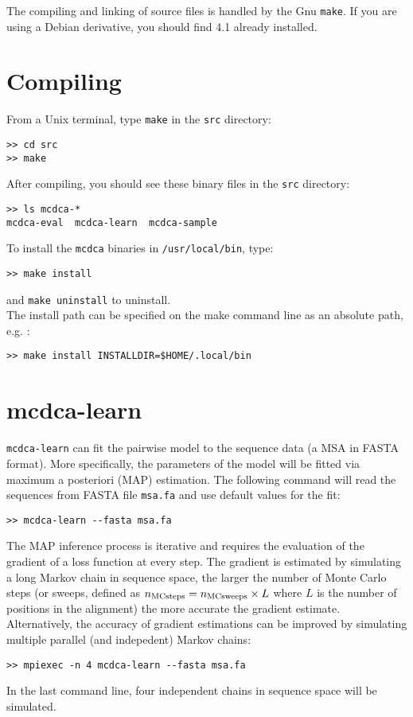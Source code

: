 \documentclass[a4paper,onecolumn]{article}
\begin{document}
The compiling and linking of source files is handled by the Gnu \verb|make|. 
If you are using a Debian derivative, you should find 4.1 already installed.

\newpage
\section{Compiling}
\label{sec:compiling}
From a Unix terminal, type \verb|make| in the \verb|src| directory:
\begin{verbatim}
>> cd src
>> make
\end{verbatim}
After compiling, you should see these binary files in the \verb|src| directory:
\begin{verbatim}
>> ls mcdca-*
mcdca-eval  mcdca-learn  mcdca-sample
\end{verbatim}
To install the \verb|mcdca| binaries in \verb|/usr/local/bin|, type:
\begin{verbatim}
>> make install
\end{verbatim}
and \verb|make uninstall| to uninstall.\\
The install path can be specified on the make command line as an absolute path,
e.g. :
\begin{verbatim}
>> make install INSTALLDIR=$HOME/.local/bin
\end{verbatim}

\newpage
\section{mcdca-learn}
\label{sec:mcdca-learn}
\verb|mcdca-learn| can fit the pairwise model to the sequence data (a MSA in FASTA format). 
More specifically, the parameters of the model will be fitted via maximum a posteriori (MAP) estimation.
The following command will read the sequences from FASTA file \verb|msa.fa| and use default values for the fit: 
\begin{verbatim}
>> mcdca-learn --fasta msa.fa
\end{verbatim}
The MAP inference process is iterative and requires the evaluation of the gradient of a loss function at every step. 
The gradient is estimated by simulating a long Markov chain in sequence space, the larger the number of Monte Carlo steps
(or sweeps, defined as $n_{\rm MC steps} = n_{\rm MC sweeps} \times L$ where $L$ is the number of positions in the alignment) the more accurate the gradient estimate. 
Alternatively, the accuracy of gradient estimations can be improved by simulating multiple parallel (and indepedent) Markov chains: 
\begin{verbatim}
>> mpiexec -n 4 mcdca-learn --fasta msa.fa
\end{verbatim}
In the last command line, four independent chains in sequence space will be simulated. 
\end{document}
